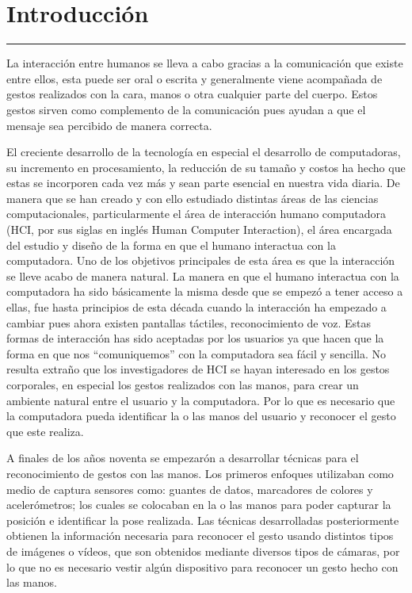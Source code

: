 \chapter{Introducci\'on}\label{capit:cap1}
\vspace{-2.0325ex}%
\noindent
\rule{\textwidth}{0.5pt}
\vspace{-5.5ex}%
\newcommand{\pushline}{\Indp}%

La interacción entre humanos se lleva a cabo gracias a la comunicación  que existe entre ellos, esta puede ser oral o escrita y generalmente viene acompañada de gestos realizados con la cara, manos o otra cualquier parte del cuerpo. 
Estos gestos sirven como complemento de la comunicación pues ayudan a que el mensaje sea percibido de manera correcta.

El creciente desarrollo de la tecnología en especial el desarrollo de computadoras, su incremento en procesamiento, la reducción de su tamaño y costos ha hecho que estas se incorporen cada vez más y sean parte esencial en nuestra vida diaria. De manera que se han creado y con ello estudiado distintas áreas de las ciencias computacionales, particularmente el área de interacción humano computadora (HCI, por sus siglas en ingl\'es Human Computer Interaction), el área encargada del estudio y diseño de la forma en que el humano interactua con la computadora. 
Uno de los objetivos principales de esta área es que la interacción se lleve acabo de manera natural. 
La manera en que el humano interactua con la computadora ha sido básicamente la misma desde que se empezó a tener acceso a ellas, fue hasta principios de esta década cuando la interacción ha empezado a cambiar pues ahora existen pantallas táctiles, reconocimiento de voz. Estas formas de interacción has sido aceptadas por los usuarios ya que hacen que la forma en que nos ``comuniquemos'' con la computadora sea fácil y sencilla. No resulta extraño que los investigadores de HCI se hayan interesado en los gestos corporales, en especial los gestos realizados con las manos, para crear un ambiente natural entre el usuario y la computadora.  
Por lo que es necesario que la computadora pueda identificar la o las manos del usuario y reconocer el gesto que este realiza. 

A finales de los años noventa se empezar\'on a desarrollar t\'ecnicas para  el reconocimiento de gestos con las manos. Los primeros enfoques utilizaban como medio de captura sensores como: guantes de datos, marcadores de colores y acelerómetros; los cuales se colocaban en la o las manos para poder capturar la posición e identificar la pose realizada. 
Las técnicas desarrolladas posteriormente obtienen la información necesaria para reconocer el gesto usando distintos tipos de imágenes o vídeos, que son obtenidos mediante diversos tipos de cámaras, por lo que no es necesario vestir algún dispositivo para reconocer un gesto hecho con las manos.

